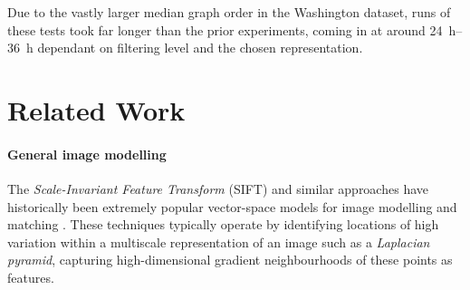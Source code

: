 \documentclass{mpaper}
\begin{document}
Due to the vastly larger median graph order in the Washington dataset, runs of these tests took far longer than the prior experiments, coming in at around \SIrange{24}{36}{\hour} dependant on filtering level and the chosen representation.

%
%
%

\section{Related Work}
\label{sec:related}

\paragraph{General image modelling}
The \emph{Scale-Invariant Feature Transform} (SIFT) and similar approaches have historically been extremely popular vector-space models for image modelling and matching \cite{SIFT,Sift-Variants-Comparison}.
These techniques typically operate by identifying locations of high variation within a multiscale representation of an image such as a \emph{Laplacian pyramid}, capturing high-dimensional gradient neighbourhoods of these points as features.
\end{document}

